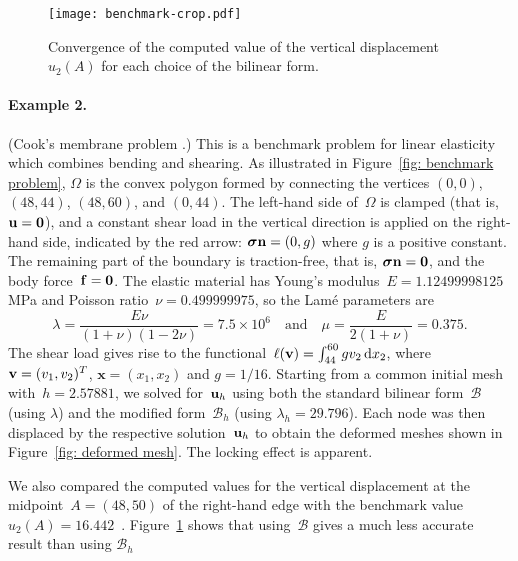 \documentclass[11pt]{article}
\newcommand{\calB}{\mathcal{B}}
\newcommand{\vf}{{\bf f}}
\newcommand{\vn}{{\bf n}}
\newcommand{\vu}{{\bf u}}
\newcommand{\vv}{{\bf v}}
\newcommand{\bsx}{{\boldsymbol{x}}}
\newcommand{\vsigma}{\boldsymbol{\sigma}}
\numberwithin{equation}{section}
\newcommand{\ud}{\mathrm{d}}
\begin{document}
\begin{figure}
\centering
\texttt{[image: benchmark-crop.pdf]}
\caption{Convergence of the computed value of the vertical
displacement~$u_2(A)$ for each choice of the bilinear form.}
\label{fig: benchmark}
\end{figure}
\paragraph{Example 2.} (Cook’s membrane problem \cite{Cook1974}.) This is a
benchmark problem for linear elasticity which combines bending and shearing.  As
illustrated in Figure~\ref{fig: benchmark problem}, $\Omega$ is the convex
polygon formed by connecting the vertices $(0,0)$, $(48,44)$, $(48,60)$, and
$(0,44)$. The left-hand side of~$\Omega$ is clamped (that is,
$\vu=\mathbf{0}$), and a constant shear load in the vertical direction is
applied on the right-hand side, indicated by the red arrow: $\vsigma \vn =(0,g)$
where $g$ is a positive constant.  The remaining  part of the boundary is
traction-free, that is, $\vsigma \vn=\mathbf{0}$, and the body
force~$\vf=\mathbf{0}$.  The elastic material has Young's
modulus~$E=1.12499998125$ MPa and Poisson ratio~$\nu=0.499999975$, so  the
Lam\'e parameters are
\[
\lambda=\frac{E\nu}{(1+\nu)(1-2\nu)}=7.5\times10^6\quad\text{and}\quad
\mu= \frac{E}{2(1+\nu)}=0.375.
\]
The shear load gives rise to the
functional~$\ell(\vv) = \int_{44}^{60}g v_2\,\ud x_2$, where
$\vv=(v_1,v_2)^T$, $\bsx=(x_1,x_2)$ and $g=1/16$.  Starting from a common
initial mesh with~$h=2.57881$, we solved for~$\vu_h$ using both the
standard bilinear form~$\calB$ (using $\lambda$) and the modified
form~$\calB_h$ (using $\lambda_h=29.796$). Each node was then displaced by the
respective solution~$\vu_h$ to obtain the deformed meshes shown in
Figure~\ref{fig: deformed mesh}.  The locking effect is apparent.

We also compared the computed values for the vertical displacement at the
midpoint~$A=(48,50)$ of the right-hand edge with the benchmark value
$u_2(A)=16.442$~\cite[p.~3491]{LiuWang2022}.  Figure~\ref{fig: benchmark} shows
that using~$\calB$ gives a much less accurate result than using $\calB_h$
\end{document}
